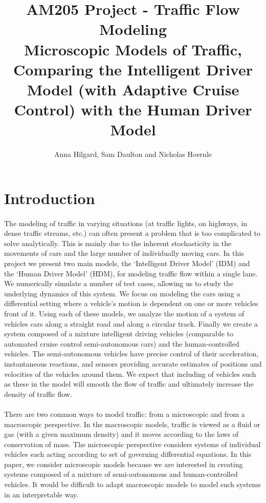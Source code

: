 \documentclass[12pt]{article}
\title{AM205 Project - Traffic Flow Modeling\\
\Large{Microscopic Models of Traffic, Comparing the Intelligent Driver Model (with Adaptive Cruise Control) with the Human Driver Model}}
\author
{Anna Hilgard, Sam Daulton and Nicholas Hoernle}
\date{}
\begin{document}

\maketitle

\section{Introduction}

\paragraph{}
The modeling of traffic in varying situations (at traffic lights, on highways, in dense traffic streams, etc.) can often present a problem that is too complicated to solve analytically. This is mainly due to the inherent stochasticity in the movements of cars and the large number of individually moving cars.
In this project we present two main models, the `Intelligent Driver Model' (IDM) and the `Human Driver Model' (HDM), for modeling traffic flow within a single lane. We numerically simulate a number of test cases, allowing us to study the underlying dynamics of this system. We focus on modeling the cars using a differential setting where a vehicle's motion is dependent on one or more vehicles front of it. Using each of these models, we analyze the motion of a system of vehicles cars along a straight road and along a circular track.  Finally we create a system composed of a mixture intelligent driving vehicles (comparable to automated cruise control semi-autonomous cars) and the human-controlled vehicles. The semi-autonomous vehicles have precise control of their acceleration, instantaneous reactions, and sensors providing accurate estimates of positions and velocities of the vehicles around them.  We expect that including of vehicles such as these in the model will smooth the flow of traffic and ultimately increase the density of traffic flow.

\paragraph{}There are two common ways to model traffic: from a microscopic and from a macroscopic perspective. In the macroscopic models, traffic is viewed as a fluid or gas (with a given maximum density) and it moves according to the laws of conservation of mass. The microscopic perspective considers systems of individual vehicles each acting according to set of governing differential equations\cite[Chapter~34]{microscopic_modelling}.  In this paper, we consider microscopic models because we are interested in creating systems composed of a mixture of semi-autonomous and human-controlled vehicles.  It would be difficult to adapt macroscopic models to model such systems in an interpretable way.
\end{document}
